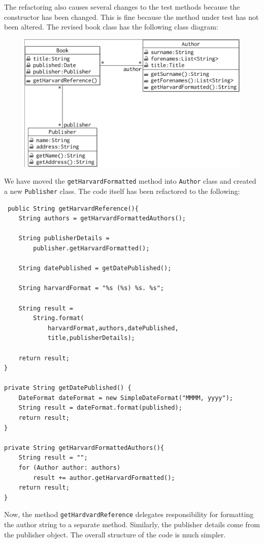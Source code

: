 \documentclass[a4paper, openany]{memoir}
\begin{document}
The refactoring also causes several changes to the test methods because the constructor has been changed. This is fine because the method under test has not been altered. The revised book class has the following class diagram:
\begin{figure}[H]
    \centering
    \includegraphics[scale=0.25]{src/16.3 book class refactored.png}
\end{figure}
\noindent We have moved the \texttt{getHarvardFormatted} method into \texttt{Author} class and created a new \texttt{Publisher} class. The code itself has been refactored to the following:
\begin{verbatim}
 public String getHarvardReference(){
    String authors = getHarvardFormattedAuthors();

    String publisherDetails =
        publisher.getHarvardFormatted();
    
    String datePublished = getDatePublished();
    
    String harvardFormat = "%s (%s) %s. %s";
    
    String result = 
        String.format(
            harvardFormat,authors,datePublished,
            title,publisherDetails);    
    
    return result;
}

private String getDatePublished() {     
    DateFormat dateFormat = new SimpleDateFormat("MMMM, yyyy");
    String result = dateFormat.format(published);
    return result;
}

private String getHarvardFormattedAuthors(){
    String result = "";
    for (Author author: authors)
        result += author.getHarvardFormatted();
    return result;
}
\end{verbatim}

Now, the method \texttt{getHardvardReference} delegates responsibility for formatting the author string to a separate method. Similarly, the publisher details come from the publisher object. The overall structure of the code is much simpler.
\end{document}
